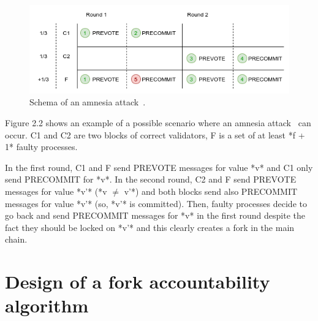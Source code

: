 \documentclass[a4paper,11pt,oneside]{report}
\begin{document}
\begin{figure}[h]
\centering
\includegraphics[scale=0.8]{fork_scenario.png} 
\caption{Schema of an amnesia attack~\cite{amnesia-attack}.}
\label{fig:subim1}
\end{figure}

\begin{markdown}

Figure 2.2 shows an example of a possible scenario where an amnesia attack~\cite{amnesia-attack} can occur.
C1 and C2 are two blocks of correct validators, F is a set of at least *f + 1* faulty processes.

In the first round, C1 and F send PREVOTE messages for value *v* and C1 only send PRECOMMIT for *v*. 
In the second round, C2 and F send PREVOTE messages for value *v'* (*v $\neq$ v'*) 
and both blocks send also PRECOMMIT messages for value *v'* (so, *v'* is committed).
Then, faulty processes decide to go back and send PRECOMMIT messages for *v* in the first round despite the fact they should be locked on *v'* and this clearly creates a fork in the main chain.

\end{markdown}

\chapter{Design of a fork accountability algorithm}
\end{document}
